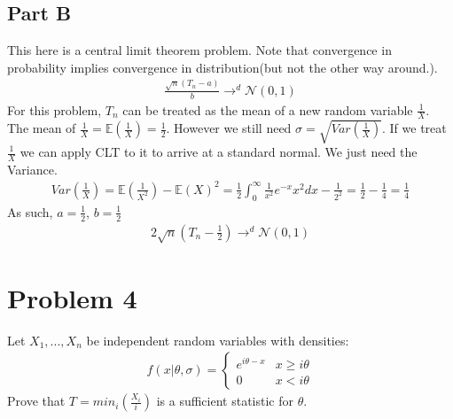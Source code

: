 \documentclass{article}
\begin{document}
\subsection*{Part B}
This here is a central limit theorem problem. Note that convergence in probability implies convergence in distribution(but not the other way around.).
\begin{align*}
\frac{\sqrt{n}(T_n-a)}{b} \rightarrow^d \mathcal{N}(0,1)
\end{align*}
For this problem, $T_n$ can be treated as the mean of a new random variable $\frac{1}{X}$. The mean of $\frac{1}{X}=\mathbb{E}(\frac{1}{X})=\frac{1}{2}$. However we still need $\sigma=\sqrt{Var(\frac{1}{X})}$. If we treat $\frac{1}{X}$ we can apply CLT to it to arrive at a standard normal. We just need the Variance.
\begin{align*}
Var(\frac{1}{X}) = \mathbb{E}(\frac{1}{X^2}) - \mathbb{E}(X)^2 = \tfrac{1}{2} \int_{0}^{\infty} \frac{1}{x^2} e^{-x}x^2 dx - \frac{1}{2^2} = \frac{1}{2} - \frac{1}{4} = \frac{1}{4}
\end{align*}
As such, $a=\frac{1}{2}$, $b=\frac{1}{2}$
\begin{align*}
\boxed{ 2\sqrt{n}(T_n-\frac{1}{2}) \rightarrow^d \mathcal{N}(0,1) }
\end{align*}
\clearpage

\section*{Problem 4}
Let $X_1,...,X_n$ be independent random variables with densities:
\begin{align*}
f(x|\theta,\sigma) = \begin{cases} 
      e^{i\theta - x} & x \geq i\theta \\
       0 & x < i\theta 
   \end{cases}
\end{align*}
Prove that $T = min_i(\frac{X_i}{i})$ is a sufficient statistic for $\theta$.
\end{document}
